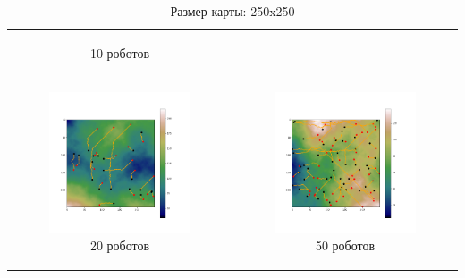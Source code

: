 \documentclass{article}
\begin{document}
\begin{table}[H]
\begin{tabular}{c c}
\begin{subfigure}{0.5\linewidth}
			\caption*{10 роботов}
			\end{subfigure}
			\\
            \begin{subfigure}{0.5\linewidth}
				\includegraphics[width = 1.0\columnwidth]{data/mean_paths/250x250/20.png}
			\caption*{20 роботов}
			\end{subfigure}
			&
			\begin{subfigure}{0.5\linewidth}
				\includegraphics[width = 1.0\columnwidth]{data/mean_paths/250x250/50.png}
			\caption*{50 роботов}
			\end{subfigure}
        \end{tabular}
        \caption*{Размер карты: 250x250}
	\end{table}
\end{document}
